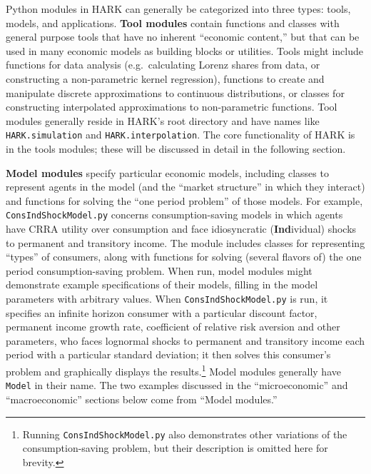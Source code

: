 \message{ !name(ccarroll_et_al_scipy_2018.tex)}\documentclass[10pt,twocolumn]{article}
\let\rmarkdownfootnote\footnote%
\def\footnote{\protect\rmarkdownfootnote}
\begin{document}
Python modules in HARK can generally be categorized into three types: tools, models, and applications. \textbf{Tool modules} contain functions and classes with general purpose tools that have no inherent ``economic content,'' but that can be used in many economic models as building blocks or utilities. Tools might include functions for data analysis (e.g.~calculating Lorenz shares from data, or constructing a non-parametric kernel regression), functions to create and manipulate discrete approximations to continuous distributions, or classes for constructing interpolated approximations to non-parametric functions.  Tool modules generally reside in HARK's root directory and have names like \texttt{HARK.simulation} and \texttt{HARK.interpolation}. The core functionality of HARK is in the tools modules; these will be discussed in detail in the following section.

\textbf{Model modules} specify particular economic models, including classes to represent agents in the model (and the ``market structure'' in which they interact) and functions for solving the ``one period problem'' of those models. For example, \texttt{ConsIndShockModel.py} concerns consumption-saving models in which agents have CRRA utility over consumption and face idiosyncratic ({\bf Ind}ividual) shocks to permanent and transitory income. The module includes classes for representing ``types'' of consumers, along with functions for solving (several flavors of) the one period consumption-saving problem. When run, model modules might demonstrate example specifications of their models, filling in the model parameters with arbitrary values. When \texttt{ConsIndShockModel.py} is run, it specifies an infinite horizon consumer with a particular discount factor, permanent income growth rate, coefficient of relative risk aversion and other parameters, who faces lognormal shocks to permanent and transitory income each period with a particular standard deviation; it then solves this consumer's problem and graphically displays the results.\footnote{Running \texttt{ConsIndShockModel.py} also demonstrates other variations of the consumption-saving problem, but their description is omitted here for brevity.} Model modules generally have \texttt{Model} in their name. The two examples discussed in the ``microeconomic'' and ``macroeconomic'' sections below come from ``Model modules.''
\end{document}
